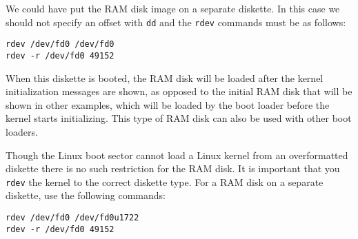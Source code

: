 \documentclass[12pt,a4paper]{article}
\begin{document}
We could have put the RAM disk image on a separate diskette. In this
case we should not specify an offset with {\tt dd} and the {\tt rdev}
commands must be as follows:
\begin{verbatim}
rdev /dev/fd0 /dev/fd0
rdev -r /dev/fd0 49152
\end{verbatim}

When this diskette is booted, the RAM disk will be loaded after the
kernel initialization messages are shown, as opposed to the initial
RAM disk that will be shown in other examples, which will be loaded by
the boot loader before the kernel starts initializing. This type of RAM
disk can also be used with other boot loaders.

Though the Linux boot sector cannot load a Linux kernel from an
overformatted diskette there is no such restriction for the RAM disk.
It is important that you {\tt rdev} the kernel to the correct diskette
type. For a RAM disk on a separate diskette, use the following commands:
\begin{verbatim}
rdev /dev/fd0 /dev/fd0u1722
rdev -r /dev/fd0 49152
\end{verbatim}
\end{document}
